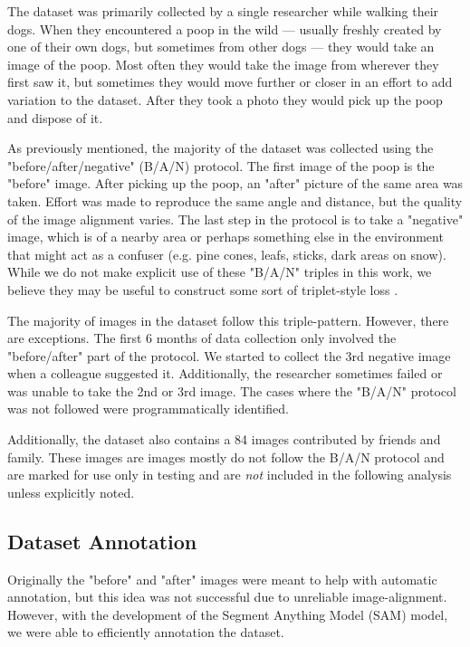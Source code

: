 \documentclass[10pt,twocolumn,letterpaper]{article}
\begin{document}
The dataset was primarily collected by a single researcher while walking their
dogs. When they encountered a poop in the wild --- usually freshly created by
one of their own dogs, but sometimes from other dogs --- they would take an
image of the poop. Most often they would take the image from wherever they
first saw it, but sometimes they would move further or closer in an effort to
add variation to the dataset. After they took a photo they would pick up the
poop and dispose of it.

As previously mentioned, the majority of the dataset was collected using the
"before/after/negative" (B/A/N) protocol. The first image of the poop is the
"before" image. After picking up the poop, an "after" picture of the same area
was taken. Effort was made to reproduce the same angle and distance, but the
quality of the image alignment varies. The last step in the protocol is to take
a "negative" image, which is of a nearby area or perhaps something else in the
environment that might act as a confuser (e.g. pine cones, leafs, sticks, dark
areas on snow). While we do not make explicit use of these "B/A/N" triples in
this work, we believe they may be useful to construct some sort of
triplet-style loss \cite{schroff_facenet_2015}.

The majority of images in the dataset follow this triple-pattern.  However,
there are exceptions.  The first 6 months of data collection only involved the
"before/after" part of the protocol.  We started to collect the 3rd negative
image when a colleague suggested it.  Additionally, the researcher sometimes
failed or was unable to take the 2nd or 3rd image. The cases where the "B/A/N"
protocol was not followed were programmatically identified.

Additionally, the dataset also contains a 84 images contributed by friends and
family. These images are images mostly do not follow the B/A/N protocol and are
marked for use only in testing and are \emph{not} included in the following
analysis unless explicitly noted.


\subsection{Dataset Annotation}

Originally the "before" and "after" images were meant to help with automatic
annotation, but this idea was not successful due to unreliable image-alignment.
However, with the development of the Segment Anything Model (SAM)
\cite{kirillov_segment_2023} model, we were able to efficiently annotation the
dataset. 
\end{document}
